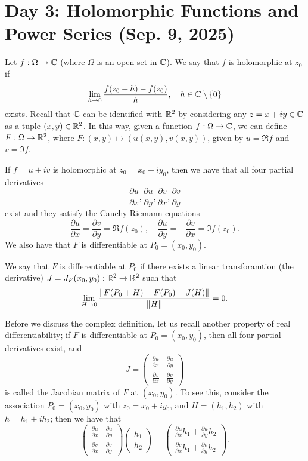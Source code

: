 \section{Day 3: Holomorphic Functions and Power Series (Sep. 9, 2025)}
Let $f : \Omega \to \mathbb C$ (where $\Omega$ is an open set in $\mathbb C$). We say that $f$ is holomorphic at $z_0$ if
\[ \lim_{h \to 0} \frac{f(z_0 + h) - f(z_0)}{h}, \quad h \in \mathbb C \setminus \{0\} \]
exists. Recall that $\mathbb C$ can be identified with $\mathbb R^2$ by considering any $z = x + iy \in \mathbb C$ as a tuple $(x, y) \in \mathbb R^2$. In this way, given a function $f : \Omega \to \mathbb C$, we can define $F : \Omega \to \mathbb R^2$, where $F : (x, y) \mapsto (u(x, y), v(x, y))$, given by $u = \Re f$ and $v = \Im f$.
\begin{proposition}
    If $f = u + iv$ is holomorphic at $z_0 = x_0 + iy_0$, then we have that all four partial derivatives
    \[ \frac{\partial u}{\partial x}, \frac{\partial u}{\partial y}, \frac{\partial v}{\partial x}, \frac{\partial v}{\partial y} \]
    exist and they satisfy the Cauchy-Riemann equations
    \[ \frac{\partial u}{\partial x} = \frac{\partial v}{\partial y} = \Re f(z_0), \quad \frac{\partial u}{\partial y} = -\frac{\partial v}{\partial x} = \Im f(z_0). \]
    We also have that $F$ is differentiable at $P_0 = (x_0, y_0)$.
\end{proposition}
\begin{definition}
    We say that $F$ is differentiable at $P_0$ if there exists a linear transforamtion (the derivative) $J = J_F(x_0, y_0) : \mathbb R^2 \to \mathbb R^2$ such that
    \[ \lim_{H \to 0} \frac{\left\lVert F(P_0 + H) - F(P_0) - J(H) \right\rVert}{\left\lVert H \right\rVert} = 0. \]
\end{definition}
\noindent Before we discuss the complex definition, let us recall another property of real differentiability; if $F$ is differentiable at $P_0 = (x_0, y_0)$, then all four partial derivatives exist, and
\[ J = \begin{pmatrix} \frac{\partial u}{\partial x} & \frac{\partial u}{\partial y} \\ \frac{\partial v}{\partial x} & \frac{\partial v}{\partial y} \end{pmatrix} \]
is called the Jacobian matrix of $F$ at $(x_0, y_0)$. To see this, consider the association $P_0 = (x_0, y_0)$ with $z_0 = x_0 + iy_0$, and $H = (h_1, h_2)$ with $h = h_1 + ih_2$; then we have that
\[ \begin{pmatrix} \frac{\partial u}{\partial x} & \frac{\partial u}{\partial y} \\ \frac{\partial v}{\partial x} & \frac{\partial v}{\partial y} \end{pmatrix} \begin{pmatrix} h_1 \\ h_2 \end{pmatrix} = \begin{pmatrix} \frac{\partial u}{\partial x} h_1 + \frac{\partial u}{\partial y} h_2 \\ \frac{\partial v}{\partial x} h_1 + \frac{\partial v}{\partial y} h_2 \end{pmatrix}. \]
